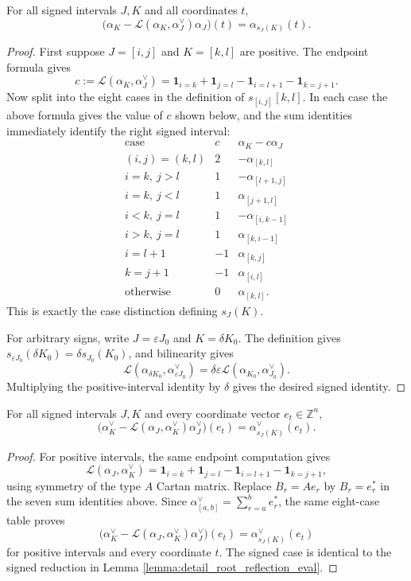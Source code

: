 \begin{lemma}\label{lemma:detail_root_reflection_eval}
For all signed intervals $J,K$ and all coordinates $t$,
\[
  \bigl(\alpha_K-\mathcal L(\alpha_K,\alpha_J^\vee)\alpha_J\bigr)(t)
  =
  \alpha_{s_J(K)}(t).
\]
\end{lemma}
\begin{proof}
First suppose $J=[i,j]$ and $K=[k,l]$ are positive.  The endpoint
formula gives
\[
  c:=\mathcal L(\alpha_K,\alpha_J^\vee)
  =
  \mathbf{1}_{i=k}+\mathbf{1}_{j=l}
  -\mathbf{1}_{i=l+1}-\mathbf{1}_{k=j+1}.
\]
Now split into the eight cases in the definition of $s_{[i,j]}[k,l]$.
In each case the above formula gives the value of $c$ shown below, and
the sum identities immediately identify the right signed interval:
\[
\begin{array}{c|c|c}
\text{case} & c & \alpha_K-c\alpha_J \\ \hline
(i,j)=(k,l) & 2 & -\alpha_{[k,l]}\\
i=k,\ j>l & 1 & -\alpha_{[l+1,j]}\\
i=k,\ j<l & 1 & \alpha_{[j+1,l]}\\
i<k,\ j=l & 1 & -\alpha_{[i,k-1]}\\
i>k,\ j=l & 1 & \alpha_{[k,i-1]}\\
i=l+1 & -1 & \alpha_{[k,j]}\\
k=j+1 & -1 & \alpha_{[i,l]}\\
\text{otherwise} & 0 & \alpha_{[k,l]}.
\end{array}
\]
This is exactly the case distinction defining $s_J(K)$.

For arbitrary signs, write $J=\varepsilon J_0$ and $K=\delta K_0$.
The definition gives $s_{\varepsilon J_0}(\delta K_0)=\delta s_{J_0}(K_0)$,
and bilinearity gives
\[
  \mathcal L(\alpha_{\delta K_0},\alpha_{\varepsilon J_0}^\vee)
  =
  \delta\varepsilon
  \mathcal L(\alpha_{K_0},\alpha_{J_0}^\vee).
\]
Multiplying the positive-interval identity by $\delta$ gives the desired
signed identity.
\end{proof}

\begin{lemma}\label{lemma:detail_coroot_reflection_apply}
For all signed intervals $J,K$ and every coordinate vector $e_t\in\mathbb Z^n$,
\[
  \bigl(\alpha_K^\vee-\mathcal L(\alpha_J,\alpha_K^\vee)\alpha_J^\vee\bigr)(e_t)
  =
  \alpha_{s_J(K)}^\vee(e_t).
\]
\end{lemma}
\begin{proof}
For positive intervals, the same endpoint computation gives
\[
  \mathcal L(\alpha_J,\alpha_K^\vee)
  =
  \mathbf{1}_{i=k}+\mathbf{1}_{j=l}
  -\mathbf{1}_{i=l+1}-\mathbf{1}_{k=j+1},
\]
using symmetry of the type $A$ Cartan matrix.  Replace $B_r=Ae_r$ by
$B_r=e_r^\ast$ in the seven sum identities above.  Since
$\alpha^\vee_{[a,b]}=\sum_{r=a}^b e_r^\ast$, the same eight-case table
proves
\[
  \bigl(\alpha_K^\vee-\mathcal L(\alpha_J,\alpha_K^\vee)\alpha_J^\vee\bigr)(e_t)
  =
  \alpha_{s_J(K)}^\vee(e_t)
\]
for positive intervals and every coordinate $t$.  The signed case is
identical to the signed reduction in Lemma
\ref{lemma:detail_root_reflection_eval}.
\end{proof}


